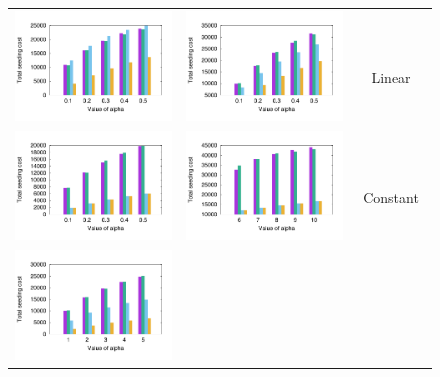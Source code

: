 \begin{figure}[t!]
\vspace{-4mm}
\begin{tabular}{ccc}
\vspace{-4mm}\includegraphics[width=.24\textwidth]{flix_alpha_totalCost_linear}&
	\hspace{-2mm}\includegraphics[width=.24\textwidth]{epi_alpha_totalCost_linear}&
\hspace{-4mm}\begin{sideways} $\;$ $\;\;$ $\;\;$ $\;\;$ $\;\;$ \textsf{\small Linear} \end{sideways} \\
\vspace{-4mm}\includegraphics[width=.24\textwidth]{flix_alpha_totalCost_uniform}&
	 \hspace{-2mm}\includegraphics[width=.24\textwidth]{epi_alpha_totalCost_uniform} &
\hspace{-4mm}\begin{sideways}  $\;$ $\;\;$ $\;\;$ $\;\;$ $\;\;$ \textsf{\small Constant} \end{sideways}\\
\vspace{-4mm}\includegraphics[width=.24\textwidth]{flix_alpha_totalCost_sublinear}&

\end{tabular}
\end{figure}
